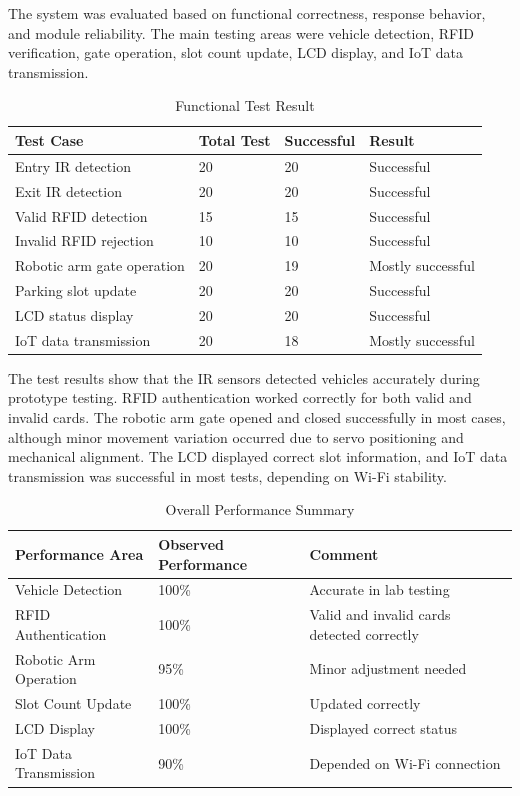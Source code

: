 The system was evaluated based on functional correctness, response behavior, and module reliability. The main testing areas were vehicle detection, RFID verification, gate operation, slot count update, LCD display, and IoT data transmission.

\begin{table}[H]
\centering
\small
\caption{Functional Test Result}
\label{tab:functional_test_result}
\begin{tabular}{p{4.6cm} p{2.2cm} p{2.2cm} p{3cm}}
\toprule
\textbf{Test Case} & \textbf{Total Test} & \textbf{Successful} & \textbf{Result} \\
\midrule
Entry IR detection & 20 & 20 & Successful \\
Exit IR detection & 20 & 20 & Successful \\
Valid RFID detection & 15 & 15 & Successful \\
Invalid RFID rejection & 10 & 10 & Successful \\
Robotic arm gate operation & 20 & 19 & Mostly successful \\
Parking slot update & 20 & 20 & Successful \\
LCD status display & 20 & 20 & Successful \\
IoT data transmission & 20 & 18 & Mostly successful \\
\bottomrule
\end{tabular}
\normalsize
\end{table}

The test results show that the IR sensors detected vehicles accurately during prototype testing. RFID authentication worked correctly for both valid and invalid cards. The robotic arm gate opened and closed successfully in most cases, although minor movement variation occurred due to servo positioning and mechanical alignment. The LCD displayed correct slot information, and IoT data transmission was successful in most tests, depending on Wi-Fi stability.

\begin{table}[H]
\centering
\small
\caption{Overall Performance Summary}
\label{tab:overall_performance}
\begin{tabular}{p{5cm} p{4cm} p{3.5cm}}
\toprule
\textbf{Performance Area} & \textbf{Observed Performance} & \textbf{Comment} \\
\midrule
Vehicle Detection & 100\% & Accurate in lab testing \\
RFID Authentication & 100\% & Valid and invalid cards detected correctly \\
Robotic Arm Operation & 95\% & Minor adjustment needed \\
Slot Count Update & 100\% & Updated correctly \\
LCD Display & 100\% & Displayed correct status \\
IoT Data Transmission & 90\% & Depended on Wi-Fi connection \\
\bottomrule
\end{tabular}
\normalsize
\end{table}

